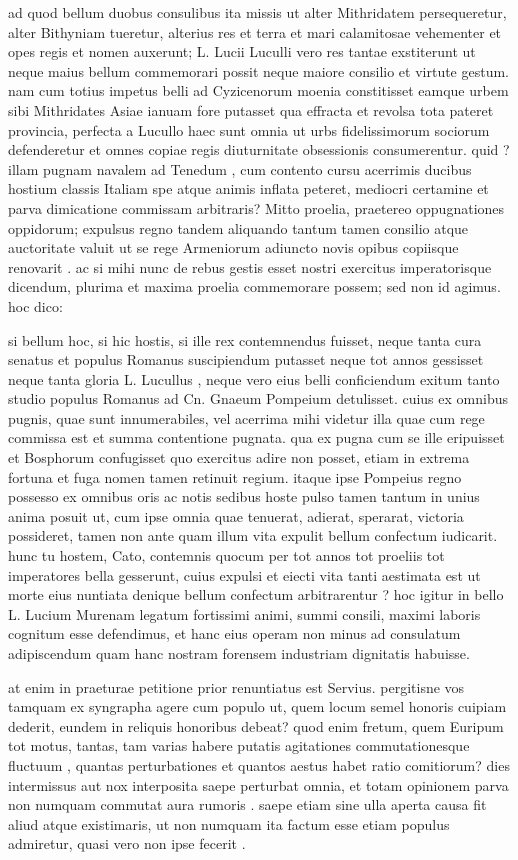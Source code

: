  ad quod bellum duobus consulibus ita missis ut alter Mithridatem persequeretur, alter Bithyniam tueretur, alterius res et terra et mari calamitosae vehementer et opes regis et nomen auxerunt; L. Lucii Luculli vero res tantae exstiterunt ut neque maius bellum commemorari possit neque maiore consilio et virtute gestum. nam cum totius impetus belli ad Cyzicenorum moenia constitisset eamque urbem sibi Mithridates Asiae ianuam fore putasset qua effracta et revolsa tota pateret provincia, perfecta a Lucullo haec sunt omnia ut urbs fidelissimorum sociorum defenderetur et omnes copiae regis diuturnitate obsessionis consumerentur. quid ? illam pugnam navalem ad Tenedum , cum contento cursu acerrimis ducibus hostium classis Italiam spe atque animis inflata peteret, mediocri certamine et parva dimicatione commissam arbitraris? Mitto proelia, praetereo oppugnationes oppidorum; expulsus regno tandem aliquando tantum tamen consilio atque auctoritate valuit ut se rege Armeniorum adiuncto novis opibus copiisque renovarit . ac si mihi nunc de rebus gestis esset nostri exercitus imperatorisque dicendum, plurima et maxima proelia commemorare possem; sed non id agimus. hoc dico:

 si bellum hoc, si hic hostis, si ille rex contemnendus fuisset, neque tanta cura senatus et populus Romanus suscipiendum putasset neque tot annos gessisset neque tanta gloria L. Lucullus , neque vero eius belli conficiendum exitum tanto studio populus Romanus ad Cn. Gnaeum Pompeium detulisset. cuius ex omnibus pugnis, quae sunt innumerabiles, vel acerrima mihi videtur illa quae cum rege commissa est et summa contentione pugnata. qua ex pugna cum se ille eripuisset et Bosphorum confugisset quo exercitus adire non posset, etiam in extrema fortuna et fuga nomen tamen retinuit regium. itaque ipse Pompeius regno possesso ex omnibus oris ac notis sedibus hoste pulso tamen tantum in unius anima posuit ut, cum ipse omnia quae tenuerat, adierat, sperarat, victoria possideret, tamen non ante quam illum vita expulit bellum confectum iudicarit. hunc tu hostem, Cato, contemnis quocum per tot annos tot proeliis tot imperatores bella gesserunt, cuius expulsi et eiecti vita tanti aestimata est ut morte eius nuntiata denique bellum confectum arbitrarentur ? hoc igitur in bello L. Lucium Murenam legatum fortissimi animi, summi consili, maximi laboris cognitum esse defendimus, et hanc eius operam non minus ad consulatum adipiscendum quam hanc nostram forensem industriam dignitatis habuisse.

 at enim in praeturae petitione prior renuntiatus est Servius. pergitisne vos tamquam ex syngrapha agere cum populo ut, quem locum semel honoris cuipiam dederit, eundem in reliquis honoribus debeat? quod enim fretum, quem Euripum tot motus, tantas, tam varias habere putatis agitationes commutationesque fluctuum , quantas perturbationes et quantos aestus habet ratio comitiorum? dies intermissus aut nox interposita saepe perturbat omnia, et totam opinionem parva non numquam commutat aura rumoris . saepe etiam sine ulla aperta causa fit aliud atque existimaris, ut non numquam ita factum esse etiam populus admiretur, quasi vero non ipse fecerit .


